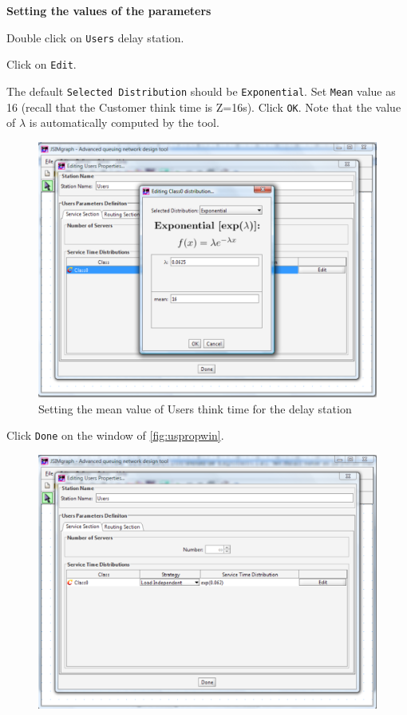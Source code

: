 \noindent \textbf{Setting the values of the parameters}
\begin{itemize*} \item
Double click on \texttt{Users} delay station. \item  Click on
\texttt{Edit}. \item The default \texttt{Selected Distribution}
should be \texttt{Exponential}. Set \texttt{Mean} value as 16
(recall that the Customer think time is Z=16s). Click \texttt{OK}.
Note that the value of $\lambda$ is automatically computed by the
tool.

\begin{figure}[htb]
    \begin{center}
        \includegraphics[scale=.5]{img/jsimg/12.3.eps}
    \end{center}
    \caption{Setting the mean value of Users think time for the delay station}
    \label{fig:meanthin}
\end{figure}
\item Click \texttt{Done} on the window of
\autoref{fig:uspropwin}.
\begin{figure}[htb]
    \begin{center}
        \includegraphics[scale=.5]{img/jsimg/12.4.eps}

\end{center}
\end{figure}
\end{itemize*}
